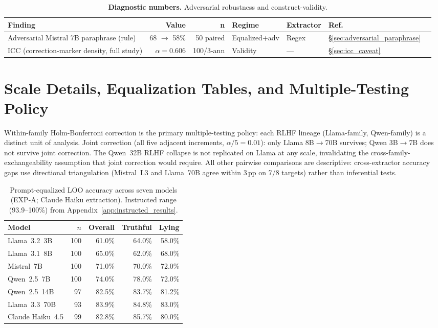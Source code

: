 \begin{table}[h]
\centering
\caption{\textbf{Diagnostic numbers.} Adversarial robustness and construct-validity.}
\label{tab:headlines_diagnostics}
\begin{small}
\begin{tabular}{lrrllll}
\toprule
\textbf{Finding} & \textbf{Value} & \textbf{n} & \textbf{Regime} & \textbf{Extractor} & \textbf{Ref.} \\
\midrule
Adversarial Mistral 7B paraphrase (rule) & 68 $\to$ 58\% & 50 paired & Equalized+adv & Regex & \S\ref{sec:adversarial_paraphrase} \\
ICC (correction-marker density, full study) & $\alpha\!=\!0.606$ & 100/3-ann & Validity & --- & \S\ref{sec:icc_caveat} \\
\bottomrule
\end{tabular}
\end{small}
\end{table}

\section{Scale Details, Equalization Tables, and Multiple-Testing Policy}\label{app:scale_details}\label{app:stats_policy}

Within-family Holm-Bonferroni correction is the primary multiple-testing policy: each RLHF lineage (Llama-family, Qwen-family) is a distinct unit of analysis. Joint correction (all five adjacent increments, $\alpha/5=0.01$): only Llama 8B$\to$70B survives; Qwen 3B$\to$7B does not survive joint correction. The Qwen~32B RLHF collapse is not replicated on Llama at any scale, invalidating the cross-family-exchangeability assumption that joint correction would require. All other pairwise comparisons are descriptive: cross-extractor accuracy gaps use directional triangulation (Mistral~L3 and Llama~70B agree within 3\,pp on 7/8 targets) rather than inferential tests.

\begin{table}[h]
\centering
\caption{Prompt-equalized LOO accuracy across seven models (EXP-A; Claude Haiku extraction). Instructed range (93.9--100\%) from Appendix~\ref{app:instructed_results}.}
\label{tab:prompt_equalized}
\begin{tabular}{lrrrr}
\toprule
\textbf{Model} & \textbf{$n$} & \textbf{Overall} & \textbf{Truthful} & \textbf{Lying} \\
\midrule
Llama~3.2~3B     & 100 & 61.0\% & 64.0\% & 58.0\% \\
Llama~3.1~8B     & 100 & 65.0\% & 62.0\% & 68.0\% \\
Mistral~7B       & 100 & 71.0\% & 70.0\% & 72.0\% \\
Qwen~2.5~7B      & 100 & 74.0\% & 78.0\% & 72.0\% \\
Qwen~2.5~14B     &  97 & 82.5\% & 83.7\% & 81.2\% \\
Llama~3.3~70B    &  93 & 83.9\% & 84.8\% & 83.0\% \\
Claude Haiku~4.5 &  99 & 82.8\% & 85.7\% & 80.0\% \\
\bottomrule
\end{tabular}
\end{table}

